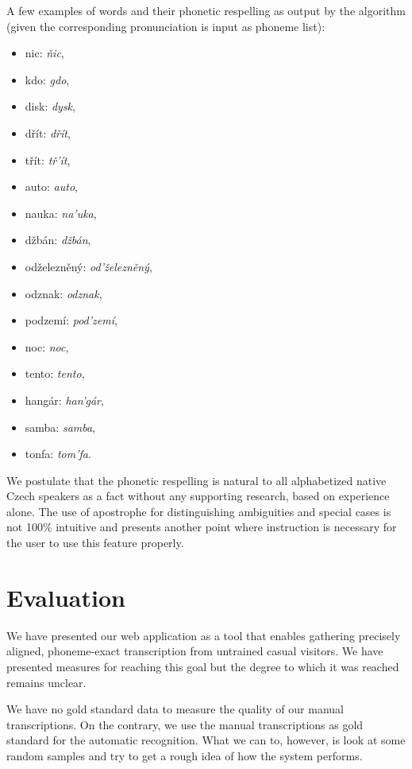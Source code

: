 \documentclass{itatnew}
\begin{document}
A few examples of words and their phonetic respelling as output by the
algorithm (given the corresponding pronunciation is input as phoneme list):
\begin{itemize}
\item{nic: {\em ňic},}
\item{kdo: {\em gdo},}
\item{disk: {\em dysk},}
\item{dřít: {\em dřít},}
\item{třít: {\em tř'ít},}
\item{auto: {\em auto},}
\item{nauka: {\em na'uka},}
\item{džbán: {\em džbán},}
\item{odželezněný: {\em od'železněný},}
\item{odznak: {\em odznak},}
\item{podzemí: {\em pod'zemí},}
\item{noc: {\em noc},}
\item{tento: {\em tento},}
\item{hangár: {\em han'gár},}
\item{samba: {\em samba},}
\item{tonfa: {\em tom'fa}.}
\end{itemize}

We postulate that the phonetic respelling is natural to all alphabetized native
Czech speakers as a fact without any supporting research, based on experience
alone. The use of apostrophe for distinguishing ambiguities and special cases is
not 100\% intuitive and presents another point where instruction is necessary
for the user to use this feature properly.

\section{Evaluation}

We have presented our web application as a tool that enables gathering precisely
aligned, phoneme-exact transcription from untrained casual visitors. We have
presented measures for reaching this goal but the degree to which it was reached
remains unclear.

We have no gold standard data to measure the quality of our manual
transcriptions. On the contrary, we use the manual transcriptions as gold
standard for the automatic recognition. What we can to, however, is look at some
random samples and try to get a rough idea of how the system performs.
\end{document}
